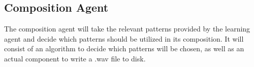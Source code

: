 \documentclass{article}
\begin{document}
\subsection{Composition Agent}
The composition agent will take the relevant patterns provided by the learning agent and decide which patterns should be utilized in its composition.  It will consist of an algorithm to decide which patterns will be chosen, as well as an actual component to write a .wav file to disk.

\nocite{*}





\end{document}

